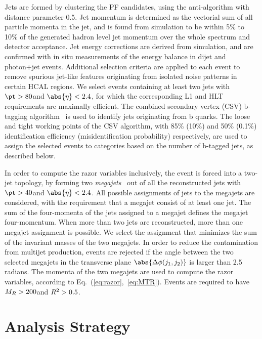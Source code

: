 Jets are formed by clustering the PF candidates, using the anti-\kt algorithm with distance
parameter 0.5. Jet momentum is determined as the vectorial sum of all
particle momenta in the jet, and is found from simulation to be within
5\% to 10\% of the generated hadron level jet momentum over the whole \pt spectrum and
detector acceptance.
 Jet energy corrections
are derived from simulation, and are confirmed with in situ
measurements of the energy balance in dijet and photon+jet events.
Additional selection criteria are applied to each event to remove
spurious jet-like features originating from isolated noise patterns in certain HCAL regions.
We select events containing at least two jets with $\pt>80$\GeV and $\abs{\eta}<2.4$, for
which the corresponding L1 and HLT requirements are maximally
efficient. The combined secondary vertex (CSV) b-tagging
algorithm~\cite{btag8TeV,btag7TeV} is used to identify jets originating from b
quarks. The loose and tight working points of the CSV algorithm, with
85\% (10\%) and 50\% (0.1\%) identification efficiency (misidentification probability) respectively, are
used to assign the selected events to categories based on the number
of b-tagged jets, as described below.

In order to compute the razor variables inclusively, the event is forced into a two-jet topology, by forming two \textit{megajets}~\cite{Chatrchyan:2014goa} out of all the reconstructed
jets with $\pt>40$\GeV and $\abs{\eta}<2.4$. All possible assignments of
jets to the megajets are considered, with the requirement that a
megajet consist of at least one jet. The sum of the four-momenta of
the jets assigned to a megajet defines the megajet
four-momentum. When more than two jets are reconstructed, more than
one megajet assignment is possible. We select the assignment that
minimizes the sum of the invariant masses of the two megajets.
In order to reduce the contamination from multijet production, events are
rejected if the angle between the two selected megajets in the
transverse plane $\abs{ \Delta\phi (j_{1}, j_{2})}$ is larger
than 2.5 radians. The momenta of the two megajets are used to compute
the razor variables, according to Eq.~(\ref{eq:razor},~\ref{eq:MTR}).  Events are
required to have $M_R>200$\GeV and $R^2>0.5$.

\section{Analysis Strategy}\label{sec:sampleDef}

